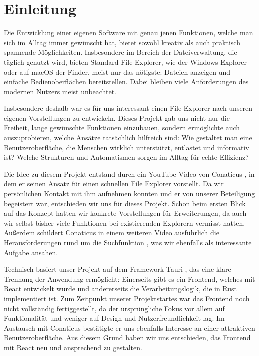 \section{Einleitung}

Die Entwicklung einer eigenen Software mit genau jenen Funktionen, welche man sich im Alltag
immer gewünscht hat, bietet sowohl kreativ als auch praktisch spannende Möglichkeiten. Insbesondere
im Bereich der Dateiverwaltung, die täglich genutzt wird, bieten Standard-File-Explorer, wie der
Windows-Explorer oder auf macOS der Finder, meist nur das nötigste: Dateien anzeigen und einfache
Bedienoberflächen bereitstellen. Dabei bleiben viele Anforderungen des modernen Nutzers meist
unbeachtet.

Insbesondere deshalb war es für uns interessant einen File Explorer nach unseren eigenen
Vorstellungen zu entwickeln. Dieses Projekt gab uns nicht nur die Freiheit, lange
gewünschte Funktionen einzubauen, sondern ermöglichte auch auszuprobieren, welche
Ansätze tatsächlich hilfreich sind: Wie gestaltet man eine Benutzeroberfläche, die Menschen wirklich
unterstützt, entlastet und informativ ist? Welche Strukturen und Automatismen sorgen im Alltag für
echte Effizienz?

Die Idee zu diesem Projekt entstand durch ein YouTube-Video von Conaticus \cite{conaticus01}, in
dem er seinen Ansatz für einen schnellen File Explorer vorstellt. Da wir persönlichen Kontakt mit
ihm aufnehmen konnten und er von unserer Beteiligung begeistert war, entschieden wir uns für
dieses Projekt. Schon beim ersten Blick auf das Konzept hatten wir konkrete Vorstellungen für
Erweiterungen, da auch wir selbst bisher viele Funktionen bei existierenden Explorern vermisst
hatten. Außerdem schildert Conaticus in einem weiteren Video ausführlich die Herausforderungen rund
um die Suchfunktion \cite{conaticus02}, was wir ebenfalls als interessante Aufgabe ansahen.

Technisch basiert unser Projekt auf dem Framework Tauri \cite{tauri2025}, das eine klare Trennung
der Anwendung ermöglicht: Einerseits gibt es ein Frontend, welches mit React entwickelt wurde und
andererseits die Verarbeitungslogik, die in Rust implementiert ist. Zum Zeitpunkt unserer
Projektstartes war das Frontend noch nicht vollständig fertiggestellt, da der ursprüngliche Fokus
vor allem auf Funktionalität und weniger auf Design und Nutzerfreundlichkeit lag. Im Austausch mit
Conaticus bestätigte er uns ebenfalls Interesse an einer attraktiven Benutzeroberfläche. Aus diesem
Grund haben wir uns entschieden, das Frontend mit React neu und ansprechend zu gestalten.